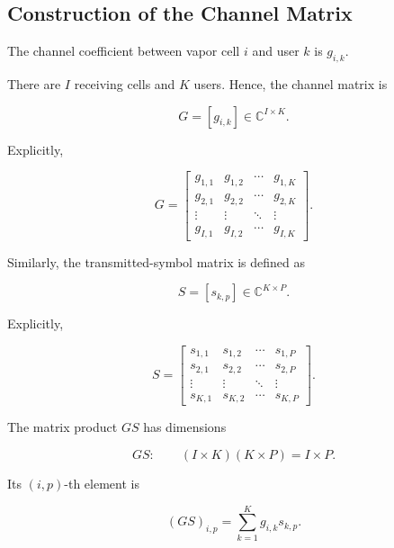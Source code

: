 \documentclass[12pt,a4paper]{article}
\begin{document}
\subsection{Construction of the Channel Matrix}

The channel coefficient between vapor cell $i$ and user $k$ is $g_{i,k}$.

There are $I$ receiving cells and $K$ users. Hence, the channel matrix is

\begin{equation}
\boxed{
G=[g_{i,k}]
\in
\mathbb{C}^{I\times K}
}.
\tag{143}
\end{equation}

Explicitly,

\begin{equation}
G=
\begin{bmatrix}
g_{1,1} & g_{1,2} & \cdots & g_{1,K}\\
g_{2,1} & g_{2,2} & \cdots & g_{2,K}\\
\vdots & \vdots & \ddots & \vdots\\
g_{I,1} & g_{I,2} & \cdots & g_{I,K}
\end{bmatrix}.
\tag{144}
\end{equation}

Similarly, the transmitted-symbol matrix is defined as

\begin{equation}
\boxed{
S=[s_{k,p}]
\in
\mathbb{C}^{K\times P}
}.
\tag{145}
\end{equation}

Explicitly,

\begin{equation}
S=
\begin{bmatrix}
s_{1,1} & s_{1,2} & \cdots & s_{1,P}\\
s_{2,1} & s_{2,2} & \cdots & s_{2,P}\\
\vdots & \vdots & \ddots & \vdots\\
s_{K,1} & s_{K,2} & \cdots & s_{K,P}
\end{bmatrix}.
\tag{146}
\end{equation}

The matrix product $GS$ has dimensions

\begin{equation}
G S:
\qquad
(I\times K)(K\times P)
=
I\times P.
\tag{147}
\end{equation}

Its $(i,p)$-th element is

\begin{equation}
(GS)_{i,p}
=
\sum_{k=1}^{K}
g_{i,k}s_{k,p}.
\tag{148}
\end{equation}
\end{document}
